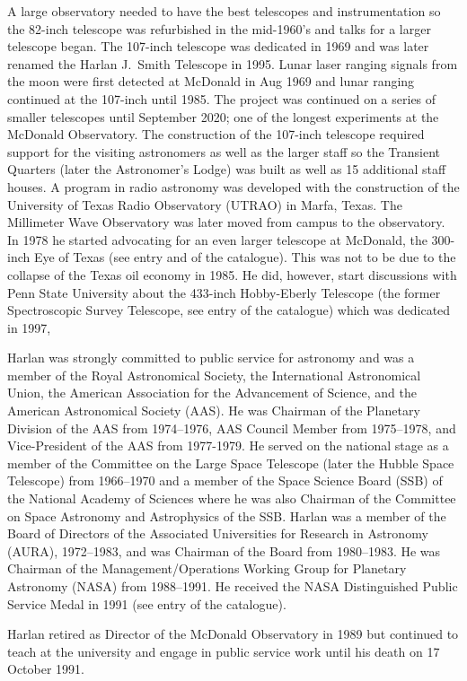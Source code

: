 A large observatory needed to have the best telescopes and
instrumentation so the 82-inch telescope was refurbished in the
mid-1960's and talks for a larger telescope began.  The
107-inch telescope was dedicated in 1969 and was later renamed the
Harlan J.~Smith Telescope in 1995. Lunar laser ranging signals from
the moon were first detected at McDonald in Aug 1969 and lunar
ranging continued at the 107-inch until 1985. The project was
continued on a series of smaller telescopes until September 2020; one
of the longest experiments at the McDonald Observatory. The
construction of the 107-inch telescope required support for the
visiting astronomers as well as the larger staff so the Transient
Quarters (later the Astronomer's Lodge) was built as well as 15
additional staff houses. A program in radio astronomy was developed
with the construction of the University of Texas Radio Observatory
(UTRAO) in Marfa, Texas. The Millimeter Wave Observatory was later
moved from campus to the observatory. In 1978 he started advocating
for an even larger telescope at McDonald, the 300-inch Eye of Texas
(see entry  and  of the catalogue). This was
not to be due to the collapse of the Texas oil economy in 1985. He
did, however, start discussions with Penn State University about the
433-inch Hobby-Eberly Telescope (the former Spectroscopic Survey
Telescope, see entry  of the catalogue) which was dedicated
in 1997,

Harlan was strongly committed to public service for astronomy and was
a member of the Royal Astronomical Society, the International
Astronomical Union, the American Association for the Advancement of
Science, and the American Astronomical Society (AAS). He was Chairman
of the Planetary Division of the AAS from 1974--1976, AAS Council
Member from 1975--1978, and Vice-President of the AAS from
1977-1979. He served on the national stage as a member of the
Committee on the Large Space Telescope (later the Hubble Space
Telescope) from 1966--1970 and a member of the Space Science Board
(SSB) of the National Academy of Sciences where he was also Chairman
of the Committee on Space Astronomy and Astrophysics of the
SSB. Harlan was a member of the Board of Directors of the Associated
Universities for Research in Astronomy (AURA), 1972--1983, and was
Chairman of the Board from 1980--1983. He was Chairman of the
Management/Operations Working Group for Planetary Astronomy (NASA)
from 1988--1991.  He received the NASA Distinguished Public Service
Medal in 1991 (see entry  of the catalogue).

Harlan retired as Director of the McDonald Observatory in 1989 but
continued to teach at the university and engage in public service work
until his death on 17 October 1991.


